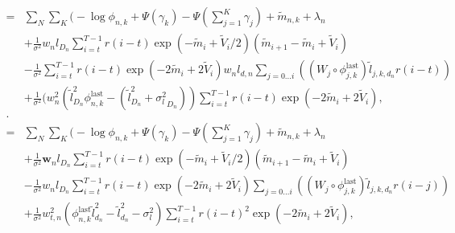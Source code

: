 \documentclass{article}
\newcommand{\mv}{\tilde{m}}
\newcommand{\vv}[0]{\tilde{V}}
\newcommand{\w}{\textbf{w}}
\newcommand{\lv}{\tilde{l}}
\newcommand{\vlv}{{\sigma^2_{l}}}
\begin{document}
\begin{align}
= & \sum_N \sum_K \Bigg( -\log{\phi_{n,k}} + \Psi(\gamma_k) - \Psi(\sum_{j=1}^K \gamma_j) + \mv_{n,k} + \lambda_n \\
&  + \frac{1}{\sigma^2} w_{n} l_{D_n} \sum_{i=t}^{T-1} r(i-t) \exp(-\mv_i + \vv_i / 2) (\mv_{i + 1} - \mv_i + \vv_i) \\
&  - \frac{1}{\sigma^2} \sum_{i=t}^{T-1} r(i-t) \exp(-2\mv_i + 2 \vv_i) w_{n} l_{d,n} \sum_{j=0\ldots i} \left( (W_{j} \circ \phi_{j,k}^{\mbox{last}}) \lv_{j,k,d_n} r(i-t) \right) \\
&  + \frac{1} {\sigma^2} (w_{n}^2 (\lv_{D_n}^2 \phi_{n,k}^{\mbox{last}} - (\lv_{D_n}^2 + \vlv_{D_n})) \sum_{i=t}^{T-1} r(i-t) \exp(-2\mv_i + 2 \vv_i), \\
. \\
 = & \sum_N \sum_K \Bigg( -\log{\phi_{n,k}} + \Psi(\gamma_k) - \Psi(\sum_{j=1}^K \gamma_j) + \mv_{n,k} + \lambda_n \\
&  + \frac{1}{\sigma^2} \w_{n} l_{D_n} \sum_{i=t}^{T-1} r(i-t) \exp(-\mv_i + \vv_i / 2) (\mv_{i + 1} - \mv_i + \vv_i) \\
&  - \frac{1}{\sigma^2} w_{n} l_{D_n} \sum_{i=t}^{T-1} r(i-t) \exp(-2\mv_i + 2 \vv_i) \sum_{j=0\ldots i} \left( (W_{j} \circ \phi_{j,k}^{\mbox{last}}) \lv_{j,k,d_n} r(i-j) \right) \\
&  + \frac{1} {\sigma^2} w_{t,n}^2 (\phi_{n,k}^{\mbox{last}} \lv_{d_n}^2 - \lv_{d_n}^2 - \sigma_l^2) \sum_{i=t}^{T-1} r(i-t)^2 \exp(-2\mv_i + 2 \vv_i), \\
\end{align}
\end{document}
